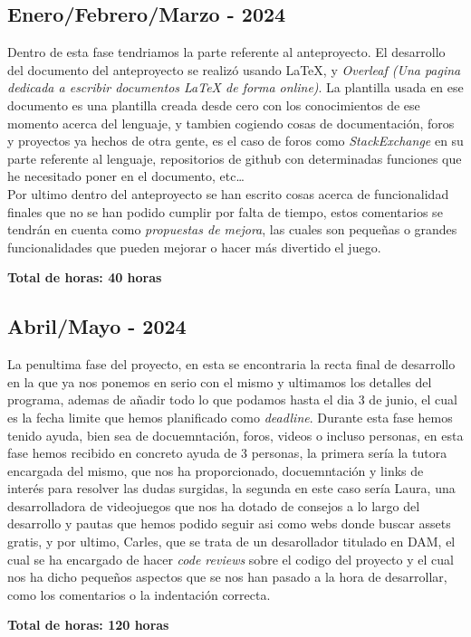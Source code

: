 \documentclass[a4paper]{article}
\begin{document}
\subsection{Enero/Febrero/Marzo - 2024}
Dentro de esta fase tendriamos la parte referente al anteproyecto. El desarrollo del documento del anteproyecto se realizó usando \LaTeX, y \textit{Overleaf (Una pagina dedicada a escribir documentos LaTeX de forma online)}. La plantilla usada en ese documento es una plantilla creada desde cero con los conocimientos de ese momento acerca del lenguaje, y tambien cogiendo cosas de documentación, foros y proyectos ya hechos de otra gente, es el caso de foros como \textit{StackExchange} en su parte referente al lenguaje, repositorios de github con determinadas funciones que he necesitado poner en el documento, etc\dots \\
Por ultimo dentro del anteproyecto se han escrito cosas acerca de funcionalidad finales que no se han podido cumplir por falta de tiempo, estos comentarios se tendrán en cuenta como \textit{propuestas de mejora}, las cuales son pequeñas o grandes funcionalidades que pueden mejorar o hacer más divertido el juego.
\begin{flushright}
    \bf Total de horas: 40 horas
\end{flushright}

\clearpage
\subsection{Abril/Mayo - 2024}
La penultima fase del proyecto, en esta se encontraria la recta final de desarrollo en la que ya nos ponemos en serio con el mismo y ultimamos los detalles del programa, ademas de añadir todo lo que podamos hasta el dia 3 de junio, el cual es la fecha limite que hemos planificado como \textit{deadline}. Durante esta fase hemos tenido ayuda, bien sea de docuemntación, foros, videos o incluso personas, en esta fase hemos recibido en concreto ayuda de 3 personas, la primera sería la tutora encargada del mismo, que nos ha proporcionado, docuemntación y links de interés para resolver las dudas surgidas, la segunda en este caso sería Laura, una desarrolladora de videojuegos que nos ha dotado de consejos a lo largo del desarrollo y pautas que hemos podido seguir asi como webs donde buscar assets gratis, y por ultimo, Carles, que se trata de un desarollador titulado en DAM, el cual se ha encargado de hacer \textit{code reviews} sobre el codigo del proyecto y el cual nos ha dicho pequeños aspectos que se nos han pasado a la hora de desarrollar, como los comentarios o la indentación correcta.
\begin{flushright}
    \bf Total de horas: 120 horas
\end{flushright}
\end{document}
